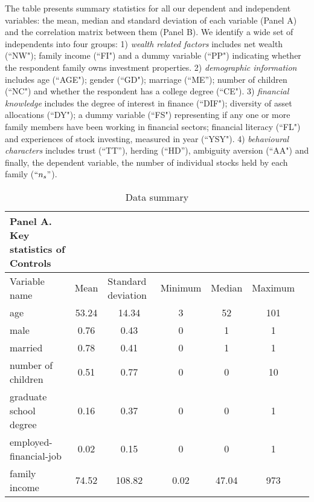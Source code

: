 \documentclass[ukenglish,nottitlepage,thmsb,11pt,letterpaper]{article}
\begin{document}
 
 \begin{spacing}{1}
 	\begin{table}[H]
 		\renewcommand\arraystretch{1.25}%
 		\caption{Data summary } 
 		The table presents summary statistics for all our dependent and independent variables: the mean, median and standard deviation of each variable (Panel A) and the correlation matrix between them (Panel B).  We identify a wide set of independents into four groups: 1) \textit{wealth related factors} includes net wealth (``NW"); family income (``FI") and a dummy variable (``PP") indicating whether the respondent family owns investment properties.  2) \textit{demographic information} includes age (``AGE"); gender (``GD");  marriage (``ME''); number of children (``NC") and whether the respondent has a college degree (``CE"). 3) \textit{financial knowledge} includes the degree of interest in finance (``DIF"); diversity of asset allocations (``DY"); a dummy variable (``FS") representing if any one or more family members have been working in financial sectors; financial literacy (``FL") and experiences of stock investing, measured in year  (``YSY"). 4) \textit{behavioural characters} includes trust (``TT''), herding (``HD''), ambiguity aversion (``AA") and finally, the dependent variable, the number of individual stocks held by each family ($``n_s"$).  
 		\begin{tabular*}{\textwidth}{l @{\extracolsep{\fill}} cccccc}
 	       \\
 			\textbf{Panel A. Key statistics of Controls}\\ 
 			\toprule
 			Variable name  & \multicolumn{1}{l}{Mean} & \multicolumn{1}{l}{Standard deviation} & \multicolumn{1}{l}{Minimum } & \multicolumn{1}{l}{Median} & \multicolumn{1}{l}{Maximum} \\
 			\midrule
 			age                     &53.24  &14.34  &3  &52  &101\\
 			male                    &0.76   &0.43   &0  &1   &1   \\
 			married                 &0.78   &0.41   &0  &1   &1   \\
 			number of children      &0.51   &0.77   &0  &0   &10  \\
 			graduate school degree  &0.16   &0.37   &0  &0   &1    \\
 			employed-financial-job  &0.02   &0.15   &0  &0   &1    \\
 			family income  &74.52  &108.82  &0.02  &47.04  &973 \\

\end{tabular*}
\end{table}
\end{spacing}
\end{document}
